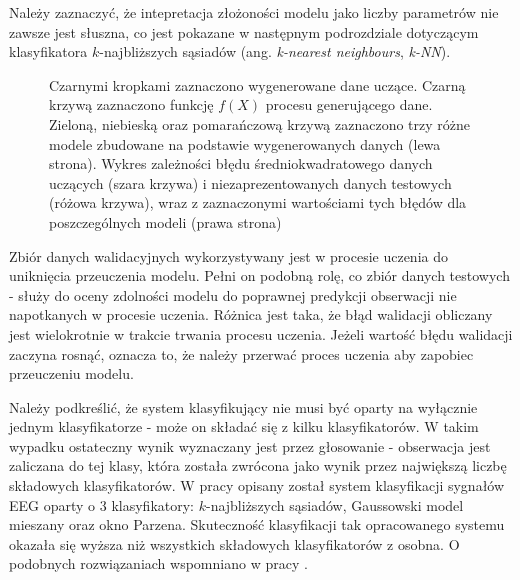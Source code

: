 \documentclass[notitlepage]{report}
\begin{document}
Należy zaznaczyć, że intepretacja złożoności modelu jako liczby parametrów nie zawsze jest słuszna, co jest pokazane w następnym podrozdziale dotyczącym klasyfikatora $k$-najbliższych sąsiadów (ang. \textit{k-nearest neighbours}, \textit{k-NN}). 
\begin{figure}[H]
	\centering
	\caption{Czarnymi kropkami zaznaczono wygenerowane dane uczące. Czarną krzywą zaznaczono funkcję $f(X)$ procesu generującego dane. Zieloną, niebieską oraz pomarańczową krzywą zaznaczono trzy różne modele zbudowane na podstawie wygenerowanych danych (lewa strona). Wykres zależności błędu średniokwadratowego danych uczących (szara krzywa) i niezaprezentowanych danych testowych (różowa krzywa), wraz z zaznaczonymi wartościami tych błędów dla poszczególnych modeli (prawa strona) \cite{islr}}
\end{figure}

Zbiór danych walidacyjnych wykorzystywany jest w procesie uczenia do uniknięcia przeuczenia modelu. Pełni on podobną rolę, co zbiór danych testowych - służy do oceny zdolności modelu do poprawnej predykcji obserwacji nie napotkanych w procesie uczenia. Różnica jest taka, że błąd walidacji obliczany jest wielokrotnie w trakcie trwania procesu uczenia. Jeżeli wartość błędu walidacji zaczyna rosnąć, oznacza to, że należy przerwać proces uczenia aby zapobiec przeuczeniu modelu. 

Należy podkreślić, że system klasyfikujący nie musi być oparty na wyłącznie jednym klasyfikatorze - może on składać się z kilku klasyfikatorów. W takim wypadku ostateczny wynik wyznaczany jest przez głosowanie - obserwacja jest zaliczana do tej klasy, która została zwrócona jako wynik przez największą liczbę składowych klasyfikatorów. W pracy \cite{lan} opisany został system klasyfikacji sygnałów EEG oparty o 3 klasyfikatory: $k$-najbliższych sąsiadów, Gaussowski model mieszany oraz okno Parzena. Skuteczność klasyfikacji tak opracowanego systemu okazała się wyższa niż wszystkich składowych klasyfikatorów z osobna. O podobnych rozwiązaniach wspomniano w pracy \cite{lotte1}.
\end{document}
